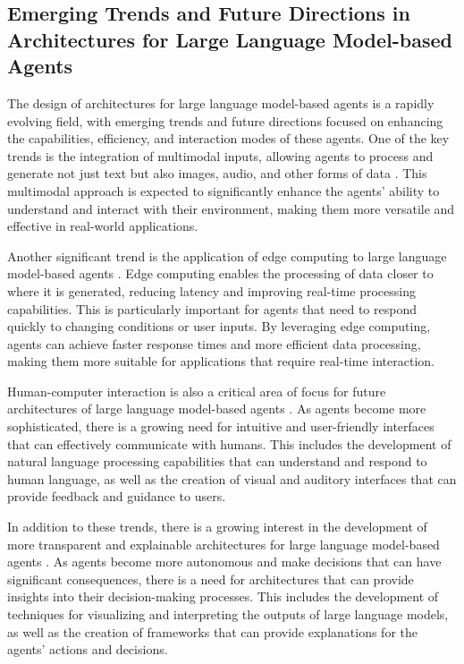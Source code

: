 \documentclass[11pt,a4paper]{article}
\begin{document}
\subsection{Emerging Trends and Future Directions in Architectures for Large Language Model-based Agents}


The design of architectures for large language model-based agents is a rapidly evolving field, with emerging trends and future directions focused on enhancing the capabilities, efficiency, and interaction modes of these agents. One of the key trends is the integration of multimodal inputs, allowing agents to process and generate not just text but also images, audio, and other forms of data \cite{arxiv:2406.04692}. This multimodal approach is expected to significantly enhance the agents' ability to understand and interact with their environment, making them more versatile and effective in real-world applications.

Another significant trend is the application of edge computing to large language model-based agents \cite{doi:10.1109/mwc.016.2300600}. Edge computing enables the processing of data closer to where it is generated, reducing latency and improving real-time processing capabilities. This is particularly important for agents that need to respond quickly to changing conditions or user inputs. By leveraging edge computing, agents can achieve faster response times and more efficient data processing, making them more suitable for applications that require real-time interaction.

Human-computer interaction is also a critical area of focus for future architectures of large language model-based agents \cite{doi:10.1145/3748302}. As agents become more sophisticated, there is a growing need for intuitive and user-friendly interfaces that can effectively communicate with humans. This includes the development of natural language processing capabilities that can understand and respond to human language, as well as the creation of visual and auditory interfaces that can provide feedback and guidance to users.

In addition to these trends, there is a growing interest in the development of more transparent and explainable architectures for large language model-based agents \cite{doi:10.1609/aaaiss.v2i1.27691}. As agents become more autonomous and make decisions that can have significant consequences, there is a need for architectures that can provide insights into their decision-making processes. This includes the development of techniques for visualizing and interpreting the outputs of large language models, as well as the creation of frameworks that can provide explanations for the agents' actions and decisions.
\end{document}
